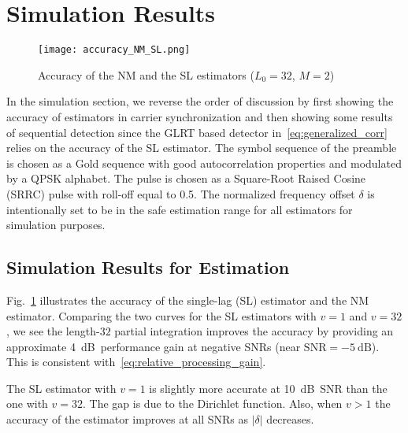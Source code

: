 \section{Simulation Results}%
\label{sec:simulations}

\begin{figure}[t]
    \centerline{\texttt{[image: accuracy\_NM\_SL.png]}}
    \caption{Accuracy of the NM and the SL estimators ($L_0=32$, $M=2$)}
    \label{fig:accuracy_NM_SL}
    \end{figure}

In the simulation section, we reverse the order of discussion by first showing 
the accuracy of estimators in carrier synchronization and then showing some results of sequential detection since
the GLRT based detector in~\eqref{eq:generalized_corr} relies on the accuracy of 
the SL estimator.
The symbol sequence of the preamble is chosen as a Gold sequence 
with good autocorrelation properties and
modulated by a QPSK alphabet.
The pulse is chosen as a
Square-Root Raised Cosine (SRRC) pulse with roll-off equal to 0.5.
The normalized frequency offset $\delta$ is intentionally set to be in
the safe estimation range for all estimators for simulation purposes. 

\subsection{Simulation Results for Estimation}%


Fig.~\ref{fig:accuracy_NM_SL} illustrates the accuracy of the single-lag (SL) estimator and the NM estimator.
Comparing the two curves for the SL estimators with $v=1$ and $v=32$, 
we see the length-$32$ partial integration
improves the accuracy by providing an approximate
\SI{4}{\dB}~performance gain at negative SNRs
(near $\text{SNR}=\SI{-5}{\dB}$). This is consistent
with~\eqref{eq:relative_processing_gain}.

The SL estimator with $v=1$ is slightly more accurate
at \SI{10}{\dB}~SNR than the one with $v=32$.
The gap is due to the Dirichlet function.
Also, when $v>1$
the accuracy of the estimator improves at all SNRs as $|\delta|$ decreases.


